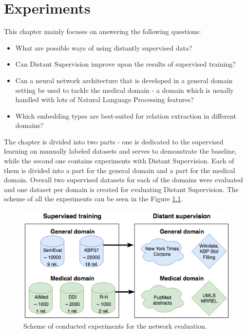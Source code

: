 \chapter{Experiments} 
\label{chapter:experiments} 

This chapter mainly focuses on answering the following questions:
\begin{itemize}
\item What are possible ways of using distantly supervised data?
\item Can Distant Supervision improve upon the results of supervised training?
\item Can a neural network architecture that is developed in a general domain setting be used to tackle the medical domain - a domain which is usually handled with lots of Natural Language Processing features?
\item Which embedding types are best-suited for relation extraction in different domains?
\end{itemize}

The chapter is divided into two parts - one is dedicated to the supervised learning on manually labeled 
datasets and serves to demonstrate the baseline, while the second one contains experiments with Distant Supervision. Each of them is divided into a part for the general domain and a part for the medical domain. Overall two supervised 
datasets for each of the domains were evaluated and one dataset per domain is created for evaluating Distant Supervision. The scheme of all the experiments can be seen in the Figure \ref{fig:exp-schema}.

\begin{figure}
\centering
\includegraphics[width=\textwidth]{chapter4_experiments/images/exp-schema.png}
\caption[Experiments scheme]{Scheme of conducted experiments for the network evaluation.}
\label{fig:exp-schema}
\end{figure}

